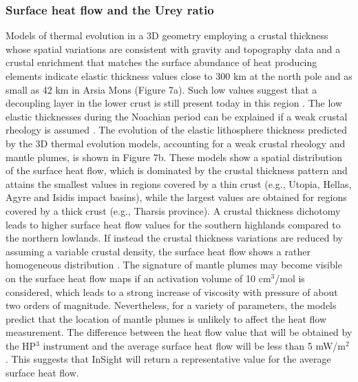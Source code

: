 \subsubsection{Surface heat flow and the Urey ratio}
\label{Te_heat_flow_Urey}



Models of thermal evolution in a 3D geometry employing a crustal thickness whose spatial variations are consistent with gravity and topography data \citep[e.g.,][]{Neumann2004} and a crustal enrichment that matches the surface abundance of heat producing elements \citep{Taylor2007, Hahn2011} indicate elastic thickness values close to 300 km at the north pole and as small as 42 km in Arsia Mons (Figure 7a). Such low values suggest that a decoupling layer in the lower crust is still present today in this region \citep{Grott2010, Plesa2016}. The low elastic thicknesses during the Noachian period can be explained if a weak crustal rheology is assumed \citep{Grott2008, Breuer2016}. The evolution of the elastic lithosphere thickness predicted by the 3D thermal evolution models, accounting for a weak crustal rheology and mantle plumes, is shown in Figure 7b. These models show a spatial distribution of the surface heat flow, which is dominated by the crustal thickness pattern \citep{Plesa2016} and attains the smallest values in regions covered by a thin crust (e.g., Utopia, Hellas, Agyre and Isidis impact basins), while the largest values are obtained for regions covered by a thick crust (e.g., Tharsis province). A crustal thickness dichotomy leads to higher surface heat flow values for the southern highlands compared to the northern lowlands. If instead the crustal thickness variations are reduced by assuming a variable crustal density, the surface heat flow shows a rather homogeneous distribution \citep{Plesa2016}. The signature of mantle plumes may become visible on the surface heat flow maps if an activation volume of 10 cm$^3$/mol is considered, which leads to a strong increase of viscosity with pressure of about two orders of magnitude. Nevertheless, for a variety of parameters, the models predict that the location of mantle plumes is unlikely to affect the heat flow measurement. The difference between the heat flow value that will be obtained by the HP$^3$ instrument and the average surface heat flow will be less than 5 mW/m$^2$ \citep{Plesa2016}. This suggests that InSight will return a representative value for the average surface heat flow.

